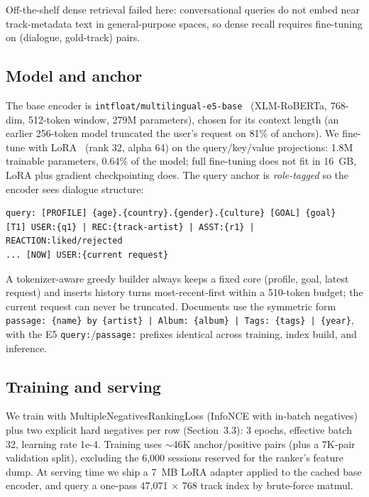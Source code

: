 \documentclass[sigconf]{acmart}
\begin{document}
Off-the-shelf dense retrieval failed here: conversational queries do not embed
near track-metadata text in general-purpose spaces, so dense recall requires
fine-tuning on (dialogue, gold-track) pairs.

\subsection{Model and anchor}

The base encoder is \texttt{intfloat/multilingual-e5-base}~\cite{e5} (XLM-RoBERTa, 768-dim,
512-token window, 279M parameters), chosen for its context length (an earlier
256-token model truncated the user's request on 81\% of anchors). We fine-tune with
LoRA~\cite{lora} (rank 32, alpha 64) on the query/key/value projections: 1.8M trainable
parameters, 0.64\% of the model; full fine-tuning does not fit in 16~GB, LoRA plus
gradient checkpointing does. The query anchor is \emph{role-tagged} so the encoder sees
dialogue structure:

\begin{lstlisting}
query: [PROFILE] {age}.{country}.{gender}.{culture} [GOAL] {goal}
[T1] USER:{q1} | REC:{track-artist} | ASST:{r1} | REACTION:liked/rejected
... [NOW] USER:{current request}
\end{lstlisting}

A tokenizer-aware greedy builder always keeps a fixed core (profile, goal, latest
request) and inserts history turns most-recent-first within a 510-token budget; the
current request can never be truncated. Documents use the symmetric form
\texttt{passage: \{name\} by \{artist\} | Album: \{album\} | Tags: \{tags\} | \{year\}}, with the
E5 \texttt{query:}/\texttt{passage:} prefixes identical across training, index build, and
inference.

\subsection{Training and serving}

We train with MultipleNegativesRankingLoss (InfoNCE with in-batch negatives) plus
two explicit hard negatives per row (Section~3.3): 3 epochs, effective
batch 32, learning rate 1e-4. Training uses $\sim$46K anchor/positive pairs (plus a
7K-pair validation split), excluding the 6,000 sessions reserved for the ranker's
feature dump. At serving time we ship
a 7~MB LoRA adapter applied to the cached base encoder, and query a one-pass
47,071 $\times$ 768 track index by brute-force matmul.
\end{document}
